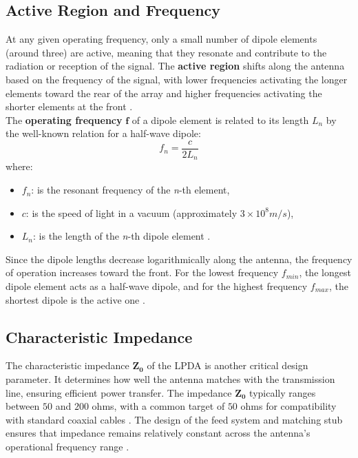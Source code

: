 \documentclass[a4paper, 12pt, english]{article}
\begin{document}
\subsection{Active Region and Frequency}
At any given operating frequency, only a small number of dipole elements (around three) are active, meaning that they resonate and contribute to the radiation or reception of the signal. The \textbf{active region} shifts along the antenna based on the frequency of the signal, with lower frequencies activating the longer elements toward the rear of the array and higher frequencies activating the shorter elements at the front \cite{carrel1966design}\cite{kraus2002antennas}. \\
The \textbf{operating frequency} $ \bm{ f } $ of a dipole element is related to its length $ {L}_{n} $ by the well-known relation for a half-wave dipole: 
\[ {f}_{n} = \frac{c}{2{L}_{n}} \]
where:
\begin{itemize}
    \item $ {f}_{n} $: is the resonant frequency of the \textit{n}-th element,
    \item $ c $: is the speed of light in a vacuum (approximately $ 3 \times { { 10 } ^ { 8 } } m/s $),
    \item $ { L }_{ n } $: is the length of the \textit{n}-th dipole element \cite{kraus2002antennas}.
\end{itemize}
Since the dipole lengths decrease logarithmically along the antenna, the frequency of operation increases toward the front. For the lowest frequency $ { f } _ { min } $, the longest dipole element acts as a half-wave dipole, and for the highest frequency $ { f } _ { max }$,  the shortest dipole is the active one \cite{balanis2016antenna}.

\subsection{Characteristic Impedance}
The characteristic impedance $ \bm{ { Z } _ { 0 } } $ of the LPDA is another critical design parameter. It determines how well the antenna matches with the transmission line, ensuring efficient power transfer. The impedance $ \bm{ { Z } _ { 0 } } $ typically ranges between $ 50 $ and $ 200 $ ohms, with a common target of $ 50 $ ohms for compatibility with standard coaxial cables \cite{nakano1996wideband}. The design of the feed system and matching stub ensures that impedance remains relatively constant across the antenna’s operational frequency range \cite{balanis2016antenna}. \\
\end{document}
